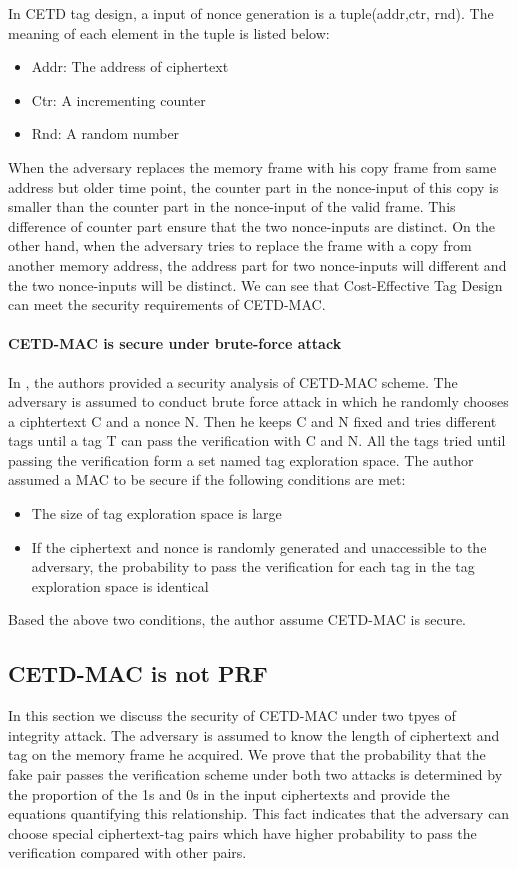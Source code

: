 In CETD tag design, a input of nonce generation is a tuple(addr,ctr, rnd). The meaning of each element in the tuple is listed below: 
\begin{itemize}
	\item Addr: The address of ciphertext
	\item Ctr: A incrementing counter 
	\item Rnd: A random number
\end{itemize}
When the adversary replaces the memory frame with his copy frame from same
address but older time point, the counter part in the nonce-input of this copy
is smaller than the counter part in the nonce-input of the valid frame. This
difference of counter part ensure that the two nonce-inputs are distinct. 
On the other hand, when the adversary tries to replace the frame with a copy
from another memory address, the address part for two nonce-inputs will
different and the two nonce-inputs will be distinct.
We can see that Cost-Effective Tag Design can meet the security requirements of
CETD-MAC.

\paragraph{CETD-MAC is secure under brute-force attack}
In \cite{}, the authors provided a security analysis of CETD-MAC scheme. The adversary is assumed to conduct brute force attack in which he randomly chooses a ciphtertext C and a nonce N. Then he keeps C and N fixed and tries different tags until a tag T can pass the verification with C and N. All the tags tried until passing the verification form a set named tag exploration space. The author assumed a MAC to be secure if the following conditions are met:
\begin{itemize}
	\item The size of tag exploration space is large
	\item If the ciphertext and nonce is randomly generated and unaccessible to the adversary, the probability to pass the verification for each tag in the tag exploration space is identical
\end{itemize}
Based the above two conditions, the author assume CETD-MAC is secure.

\subsection{CETD-MAC is not PRF}\label{sect:proportion}
In this section we discuss the security of CETD-MAC under two tpyes of integrity attack.  The adversary is assumed to know the length of ciphertext and tag on the memory frame he acquired. 
We prove that the probability that the fake pair passes the verification scheme under both two attacks is determined by the proportion of the 1s and 0s in the input ciphertexts and provide the equations quantifying this relationship. This fact indicates that the adversary can choose special ciphertext-tag pairs which have higher probability to pass the verification compared with other pairs.  


